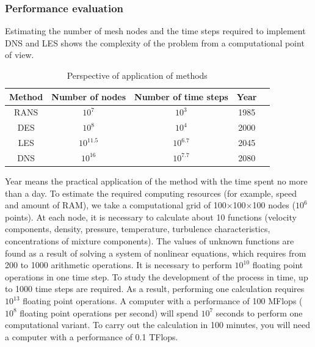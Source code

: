 \subsubsection{Performance evaluation}
	Estimating the number of mesh nodes and the time steps required to implement DNS and LES shows the complexity of the problem from a computational point of view.
	
	\begin{table}[H]
		\begin{center}
			\begin{tabular}{|c|c|c|c|c|}
				\hline
				Method & Number of nodes & Number of time steps & Year\\
				\hline
				RANS & $10^7$ & $10^3$ & 1985\\
				\hline
				DES & $10^8$ & $10^4$ & 2000\\
				\hline
				LES & $10^{11.5}$ & $10^{6.7}$ & 2045\\
				\hline
				DNS & $10^{16}$ & $10^{7.7}$ & 2080\\
				\hline
			\end{tabular}
		\end{center}
		\caption{\footnotesize{Perspective of application of methods}}
	\end{table}
	Year means the practical application of the method with the time spent no more than a day.
	To estimate the required computing resources (for example, speed and amount of RAM), we take a computational grid of 100$\times$100$\times$100 nodes ($10^6$ points). At each node, it is necessary to calculate about 10 functions (velocity components, density, pressure, temperature, turbulence characteristics, concentrations of mixture components). The values of unknown functions are found as a result of solving a system of nonlinear equations, which requires from 200 to 1000 arithmetic operations. It is necessary to perform $10^{10}$ floating point operations in one time step. To study the development of the process in time, up to 1000 time steps are required. As a result, performing one calculation requires $10^{13}$ floating point operations. A computer with a performance of 100 MFlops ($10^8$ floating point operations per second) will spend $10^7$ seconds to perform one computational variant. To carry out the calculation in 100 minutes, you will need a computer with a performance of 0.1 TFlops.